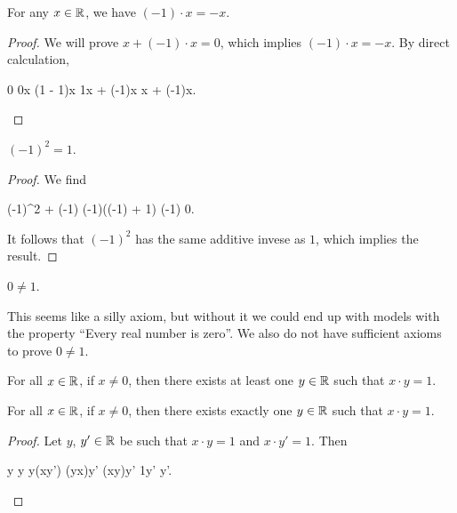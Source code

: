 \begin{theorem}\label{thm:elementary-algebra:times-neg-1-is-add-inverse}
For any $x\in\mathbb{R}$, we have $(-1)\cdot x = -x$.
\end{theorem}

\begin{proof}
We will prove $x + (-1)\cdot x = 0$, which implies $(-1)\cdot x = -x$.
By direct calculation,
\begin{calculation}
0
0\cdot x
(1 - 1)\cdot x
1\cdot x + (-1)\cdot x
x + (-1)\cdot x.\qedhere
\end{calculation}
\end{proof}

\begin{proposition}
$(-1)^{2}=1$.
\end{proposition}

\begin{proof}
We find
\begin{calculation}
(-1)^{2} + (-1)
(-1)\cdot((-1) + 1)
(-1)
0.
\end{calculation}
It follows that $(-1)^{2}$ has the same additive invese as $1$, which
implies the result.
\end{proof}

\begin{axiom}\label{axiom:elementary-algebra:0-neq-1}
$0\neq1$.
\end{axiom}

\begin{remark}
This seems like a silly axiom, but without it we could end up with
models with the property ``Every real number is zero''. We also do not
have sufficient axioms to prove $0\neq1$.
\end{remark}

\begin{axiom}
For all $x\in\mathbb{R}$, if $x\neq0$, then there exists at least one $y\in\mathbb{R}$
such that $x\cdot y=1$.
\end{axiom}

\begin{theorem}
For all $x\in\mathbb{R}$, if $x\neq0$, then there exists exactly one $y\in\mathbb{R}$
such that $x\cdot y=1$.
\end{theorem}

\begin{proof}
Let $y$, $y'\in\mathbb{R}$ be such that $x\cdot y=1$ and $x\cdot y'=1$.
Then
\begin{calculation}
  y
  y
  y\cdot(x\cdot y')
  (y\cdot x)\cdot y'
  (x\cdot y)\cdot y'
  1\cdot y'
  y'.\qedhere
\end{calculation}
\end{proof}

